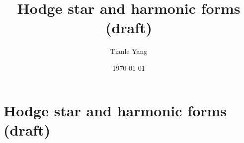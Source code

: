 \documentclass{noteformyself}
\title{Hodge star and harmonic forms (draft)}
\author{Tianle Yang}
\date{\today}
\begin{document}
    \maketitle
    \section{Hodge star and harmonic forms (draft)}




\end{document}
